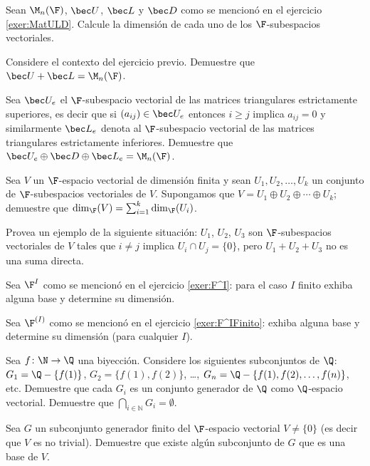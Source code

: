 \begin{exerciselist}
  \item Sean $\M_n(\F)$, $\bec U$, $\bec L$ y $\bec D$ como se mencionó en el ejercicio \ref{exer:MatULD}. Calcule la dimensión de cada uno de los $\F$-subespacios vectoriales.

  \item Considere el contexto del ejercicio previo. Demuestre que $\bec U + \bec L = \M_n(\F)$.
  
  \item Sea $\bec U_e$ el $\F$-subespacio vectorial de las matrices triangulares estrictamente superiores, es decir que si  $(a_{ij}) \in \bec U_e$ entonces $i \geq j$ implica $a_{ij} = 0$ y similarmente $\bec L_e$ denota al $\F$-subespacio vectorial de las matrices triangulares estrictamente inferiores. Demuestre que $\bec U_e \oplus \bec D \oplus \bec L_e = \M_n(\F)$.
  
  \item Sea $V$ un $\F$-espacio vectorial de dimensión finita y sean $U_1, U_2, \ldots, U_k$ un conjunto de $\F$-subespacios vectoriales de $V$. Supongamos que $V = U_1 \oplus U_2 \oplus \cdots \oplus U_k$; demuestre que $\dim_\F(V) = \sum _{i=1}^k \dim_\F(U_i)$.
  
  \item Provea un ejemplo de la siguiente situación: $U_1$, $U_2$, $U_3$ son $\F$-subespacios vectoriales de $V$ tales que $i \neq j$ implica $U_i \cap U_j = \{0\}$, pero $U_1 + U_2 + U_3$ no es una suma directa.
  
  \item Sea $\F^I$ como se mencionó en el ejercicio \ref{exer:F^I}: para el caso $I$ finito exhiba alguna base y determine su dimensión.
  
  \item Sea $\F^{(I)}$ como se mencionó en el ejercicio \ref{exer:F^IFinito}: exhiba alguna base y determine su dimensión (para cualquier $I$).
  
  \item Sea $f \colon \N \to \Q$ una biyección. Considere los siguientes subconjuntos de $\Q$: $G_1 = \Q - \{ f(1)\}$, $G_2 = \{ f(1), f(2) \}$, \dots, $G_n = \Q - \{ f(1), f(2), \ldots, f(n) \}$, etc. Demuestre que cada $G_i$ es un conjunto generador de $\Q$ como $\Q$-espacio vectorial. Demuestre que $\bigcap _{i \in \mathbb{N}} G_i = \emptyset$.
  
  \item Sea $G$ un subconjunto generador finito del $\F$-espacio vectorial $V \neq \{0\}$ (es decir que $V$ es no trivial). Demuestre que existe algún subconjunto de $G$ que es una base de $V$.
  

\end{exerciselist}
